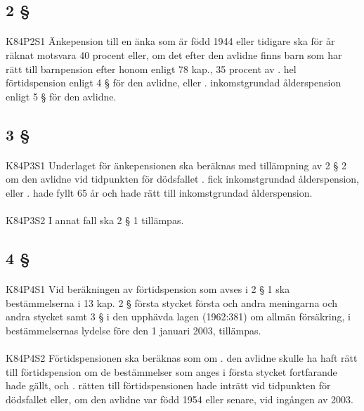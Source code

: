 \documentclass[a4paper,notitlepage,openany,10pt]{book}
\begin{document}
\subsection*{2 §}
\paragraph*{}
{\tiny K84P2S1}
Änkepension till en änka som är född 1944 eller tidigare ska för år räknat motsvara 40 procent eller, om det efter den avlidne finns barn som har rätt till barnpension efter honom enligt 78 kap., 35 procent av
. hel förtidspension enligt 4 § för den avlidne, eller
. inkomstgrundad ålderspension enligt 5 § för den avlidne.
\subsection*{3 §}
\paragraph*{}
{\tiny K84P3S1}
Underlaget för änkepensionen ska beräknas med tillämpning av 2 § 2 om den avlidne vid tidpunkten för dödsfallet
. fick inkomstgrundad ålderspension, eller
. hade fyllt 65 år och hade rätt till inkomstgrundad ålderspension.
\paragraph*{}
{\tiny K84P3S2}
I annat fall ska 2 § 1 tillämpas.
\subsection*{4 §}
\paragraph*{}
{\tiny K84P4S1}
Vid beräkningen av förtidspension som avses i 2 § 1 ska bestämmelserna i 13 kap. 2 § första stycket första och andra meningarna och andra stycket samt 3 § i den upphävda lagen (1962:381) om allmän försäkring, i bestämmelsernas lydelse före den 1 januari 2003, tillämpas.
\paragraph*{}
{\tiny K84P4S2}
Förtidspensionen ska beräknas som om
. den avlidne skulle ha haft rätt till förtidspension om de bestämmelser som anges i första stycket fortfarande hade gällt, och
. rätten till förtidspensionen hade inträtt vid tidpunkten för dödsfallet eller, om den avlidne var född 1954 eller senare, vid ingången av 2003.
\end{document}
